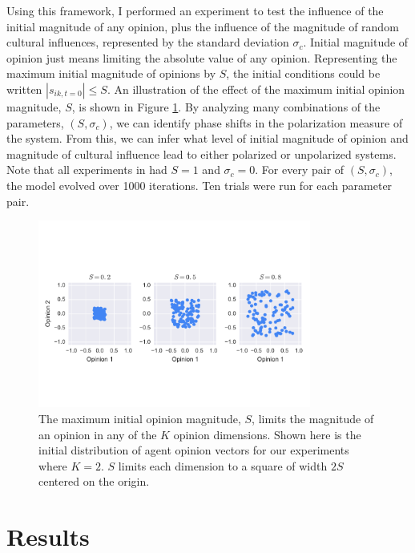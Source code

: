 \documentclass[11pt,letterpaper]{article}
\newcommand{\sigc}{\ensuremath{\sigma_c}}
\begin{document}
Using this framework, I performed an experiment to test the influence of the
initial magnitude of any opinion, plus the influence of the magnitude of 
random cultural influences, represented by the standard deviation $\sigc$.
Initial magnitude of opinion just means limiting the absolute value of any 
opinion. Representing the maximum initial magnitude of opinions by $S$, 
the initial conditions could be written $|s_{ik,t=0}| \leq S$. An illustration
of the effect of the maximum initial opinion magnitude, $S$, is shown in
Figure \ref{fig:initial-opinion-example}. By 
analyzing many combinations of the parameters, $(S, \sigc)$, we can 
identify phase shifts in the polarization measure of the system. From this, we
can infer what level of initial magnitude of opinion and magnitude of cultural
influence lead to either polarized or unpolarized systems. Note that all 
experiments in  had $S = 1$ and $\sigc = 0$.
For every pair of $(S, \sigc)$, the model evolved over 1000 iterations.
Ten trials were run for each parameter pair. 

\begin{figure}
  \centering
  \includegraphics[width=0.8\textwidth]{figures/initial-opinion-example.pdf}
  \caption{The maximum initial opinion magnitude, $S$, limits the magnitude of
  an opinion in any of the $K$ opinion dimensions. Shown here is the initial
  distribution of agent opinion vectors for our experiments where $K=2$. $S$
  limits each dimension to a square of width $2S$ centered on the origin.}
  \label{fig:initial-opinion-example}
\end{figure}

\section{Results}
\label{sec:Results}
\end{document}
